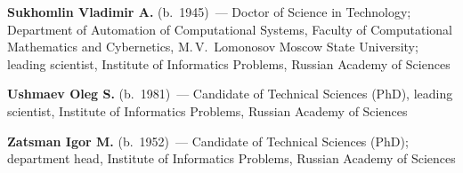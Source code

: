 \begin{multicols}{2}








\vspace*{10pt}
\noindent
\textbf{Sukhomlin Vladimir A.} (b.\ 1945)~--- Doctor of Science in Technology; 
Department of Automation of Computational Systems,
Faculty of  Computational
Mathematics and Cybernetics, M.\,V.~Lomonosov Moscow State University;
leading scientist,  Institute of Informatics Problems,  Russian Academy of Sciences







\vspace*{10pt}



\noindent %
\textbf{Ushmaev Oleg S.} (b.\ 1981)~---
Candidate of Technical Sciences (PhD), leading scientist,
Institute of Informatics Problems,  Russian Academy of Sciences

\vspace*{10pt}

\noindent
\textbf{Zatsman Igor M.} (b.\ 1952)~--- Candidate of Technical Sciences
(PhD); department head, Institute
of Informatics Problems, Russian Academy of Sciences


\end{multicols}